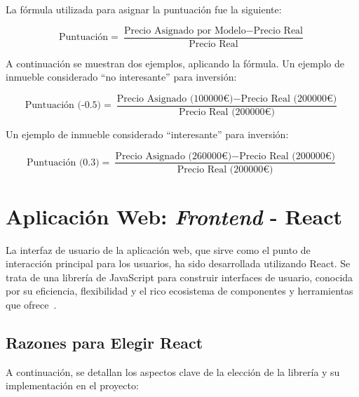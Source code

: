 La fórmula utilizada para asignar la puntuación fue la siguiente:

\begin{equation}
\text{Puntuación} = \frac{\text{Precio Asignado por Modelo} - \text{Precio Real}}{\text{Precio Real}}
\end{equation}


A continuación se muestran dos ejemplos, aplicando la fórmula. Un ejemplo de inmueble considerado ``no interesante'' para inversión:

\begin{equation}
\text{Puntuación (-0.5)} = \frac{\text{Precio Asignado (100000€)} - \text{Precio Real (200000€)}}{\text{Precio Real (200000€)}}
\end{equation}

Un ejemplo de inmueble considerado ``interesante'' para inversión:

\begin{equation}
\text{Puntuación (0.3)} = \frac{\text{Precio Asignado (260000€)} - \text{Precio Real (200000€)}}{\text{Precio Real (200000€)}}
\end{equation}

\clearpage
\section{Aplicación Web: \textit{Frontend} - React}\label{sec:frontend_section}

La interfaz de usuario de la aplicación web, que sirve como el punto de interacción principal para los usuarios, ha sido desarrollada utilizando React. Se trata de una librería de JavaScript para construir interfaces de usuario, conocida por su eficiencia, flexibilidad y el rico ecosistema de componentes y herramientas que ofrece~\cite{react}. 

\subsection{Razones para Elegir React}

A continuación, se detallan los aspectos clave de la elección de la librería y su implementación en el proyecto:

